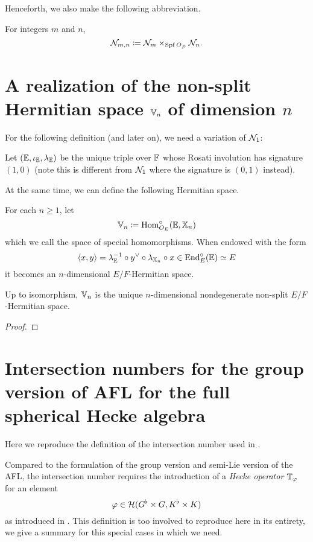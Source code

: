 Henceforth, we also make the following abbreviation.
\begin{definition}
  For integers $m$ and $n$,
  \[ \mathcal N_{m,n} \coloneq \mathcal N_{m} \times_{\operatorname{Spf} O_{\breve F}} \mathcal N_n. \]
\end{definition}

\section{A realization of the non-split Hermitian space $\mathbb V_n$ of dimension $n$}
For the following definition (and later on), we need a variation of $\mathcal N_1$:
\begin{definition}
  Let $(\mathbb E, \iota_\mathbb E, \lambda_\mathbb E)$ be the unique triple over $\mathbb F$
  whose Rosati involution has signature $(1,0)$
  (note this is different from $\mathcal N_1$ where the signature is $(0,1)$ instead).
\end{definition}

At the same time, we can define the following Hermitian space.
\begin{definition}
  For each $n \ge 1$, let
  \[ \mathbb V_n \coloneqq \operatorname{Hom}_{O_E}^\circ (\mathbb E, \mathbb X_n) \]
  which we call the space of special homomorphisms.
  When endowed with the form
  \[ \left< x,y \right> = \lambda_{\mathbb E}^{-1} \circ y^\vee \circ \lambda_{\mathbb X_n} \circ x
    \in \operatorname{End}_{E}^\circ(\mathbb E) \simeq E \]
  it becomes an $n$-dimensional $E/F$-Hermitian space.
  \label{def:VV_n}
\end{definition}
\begin{proposition}
  Up to isomorphism, $\mathbb V_n$ is the unique $n$-dimensional
  nondegenerate non-split $E/F$-Hermitian space.
\end{proposition}
\begin{proof}
\end{proof}

\section{Intersection numbers for the group version of AFL for the full spherical Hecke algebra}
Here we reproduce the definition of the intersection number used in .

Compared to the formulation of the group version and semi-Lie version of the AFL,
the intersection number requires the introduction of a
\emph{Hecke operator} $\mathbb T_{\varphi}$ for an element
\[ \varphi \in \mathcal H(G^\flat \times G, K^\flat \times K) \]
as introduced in \cite{ref:AFLspherical}.
This definition is too involved to reproduce here in its entirety,
we give a summary for this special cases in which we need.

